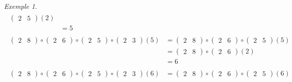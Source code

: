 \documentclass{report}
\theoremstyle{definition}
\theoremstyle{remark}
\newtheorem*{exem}{Exemple}
\begin{document}
\begin{exem}
\begin{align*}
\begin{split}
\begin{pmatrix}
					2&5
				\end{pmatrix}(2)\\
				&= 5
			\end{split}\tag{3}
			\\[8pt]
			\begin{split}
				\begin{pmatrix}
					2&8
				\end{pmatrix} \circ \begin{pmatrix}
					2&6
				\end{pmatrix} \circ \begin{pmatrix}
					2&5
				\end{pmatrix} \circ \begin{pmatrix}
					2&3
				\end{pmatrix}(5)&= \begin{pmatrix}
					2&8
				\end{pmatrix} \circ \begin{pmatrix}
					2&6
				\end{pmatrix} \circ \begin{pmatrix}
					2&5
				\end{pmatrix}(5)\\
				&= \begin{pmatrix}
					2&8
				\end{pmatrix} \circ \begin{pmatrix}
					2&6
				\end{pmatrix}(2)\\
				&= 6
			\end{split}\tag{5}
			\\[8pt]
			\begin{split}
				\begin{pmatrix}
					2&8
				\end{pmatrix} \circ \begin{pmatrix}
					2&6
				\end{pmatrix} \circ \begin{pmatrix}
					2&5
				\end{pmatrix} \circ \begin{pmatrix}
					2&3
				\end{pmatrix}(6)&= \begin{pmatrix}
					2&8
				\end{pmatrix} \circ \begin{pmatrix}
					2&6
				\end{pmatrix} \circ \begin{pmatrix}
					2&5
				\end{pmatrix}(6)\\

\end{split}
\end{align*}
\end{exem}
\end{document}
